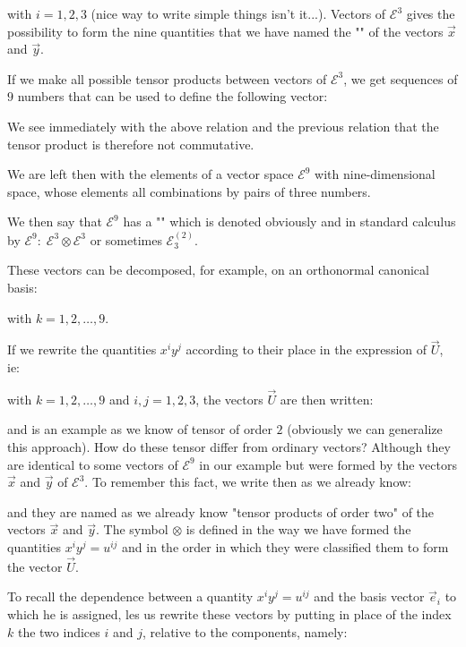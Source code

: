 	with $i=1,2,3$ (nice way to write simple things isn't it...).
	Vectors of $\mathcal{E}^3$ gives the possibility to form the nine quantities that we have named the "" of the vectors $\vec{x}$ and $\vec{y}$.
	
	If we make all possible tensor products between vectors of $\mathcal{E}^3$, we get sequences of $9$ numbers that can be used to define the following vector:
		
	\begin{tcolorbox}[title=Remark,colframe=black,arc=10pt]
	We see immediately with the above relation and the previous relation that the tensor product is therefore not commutative.
	\end{tcolorbox}
	We are left then with the elements of a vector space $\mathcal{E}^9$ with nine-dimensional space, whose elements all combinations by pairs of three numbers.
	
	We then say that $\mathcal{E}^9$ has a "" which is denoted obviously and in standard calculus by $\mathcal{E}^9:\; \mathcal{E}^3\otimes \mathcal{E}^3$ or sometimes $\mathcal{E}_3^{(2)}$.

	These vectors can be decomposed, for example, on an orthonormal canonical basis:
	
	with $k=1,2,\ldots,9$.

	If we rewrite the quantities $x^iy^j$ according to their place in the expression of $\vec{U}$, ie:
	
	with $k=1,2,\ldots,9$ and $i,j=1,2,3$, the vectors $\vec{U}$ are then written:
	
	and is an example as we know of tensor of order $2$ (obviously we can generalize this approach).
	How do these tensor differ from ordinary vectors? Although they are identical to some vectors of $\mathcal{E}^9$ in our example but were formed by the vectors $\vec{x}$ and $\vec{y}$ of $\mathcal{E}^3$. To remember this fact, we write then as we already know:
	
	and they are named as we already know "tensor products of order two" of the vectors $\vec{x}$ and $\vec{y}$. The symbol $\otimes$ is defined in the way we have formed the quantities $x^iy^j=u^{ij}$ and in the order in which they were classified them to form the vector $\vec{U}$.

	To recall the dependence between a quantity $x^iy^j=u^{ij}$ and the basis vector $\vec{e}_i$ to which he is assigned, les us rewrite these vectors by putting in place of the index $k$ the two indices $i$ and $j$, relative to the components, namely:
	
